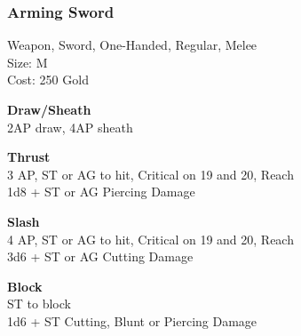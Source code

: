 \subsubsection{Arming Sword}\label{weapon:armingSword}
Weapon, Sword, One-Handed, Regular, Melee\\
Size: M\\
Cost: 250 Gold

\textbf{Draw/Sheath}\\
2AP draw, 4AP sheath

\textbf{Thrust}\\
3 AP, ST or AG to hit, Critical on 19 and 20,  Reach\\
1d8 + \texttimes ST or AG Piercing Damage

\textbf{Slash}\\
4 AP, ST or AG to hit, Critical on 19 and 20,  Reach\\
3d6 + \texttimes ST or AG Cutting Damage

\textbf{Block}\\
ST to block\\
1d6 + \texttimes ST Cutting, Blunt or Piercing Damage